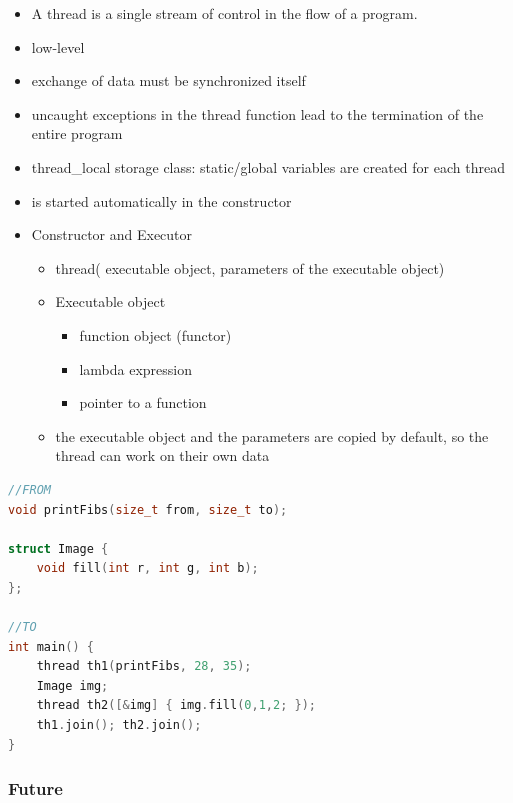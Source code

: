 \begin{itemize}
\tightlist
\item
  A thread is a single stream of control in the flow of a program.
\item
  low-level
\item
  exchange of data must be synchronized itself
\item
  uncaught exceptions in the thread function lead to the termination of
  the entire program
\item
  thread\_local storage class: static/global variables are created for
  each thread
\item
  is started automatically in the constructor
\item
  Constructor and Executor

  \begin{itemize}
  \tightlist
  \item
    thread( executable object, parameters of the executable object)
  \item
    Executable object

    \begin{itemize}
    \tightlist
    \item
      function object (functor)
    \item
      lambda expression
    \item
      pointer to a function
    \end{itemize}
  \item
    the executable object and the parameters are copied by default, so
    the thread can work on their own data
  \end{itemize}
\end{itemize}

\begin{lstlisting}[language=C++]
//FROM
void printFibs(size_t from, size_t to);

struct Image {
    void fill(int r, int g, int b);
};

//TO
int main() {
    thread th1(printFibs, 28, 35);
    Image img;
    thread th2([&img] { img.fill(0,1,2; });
    th1.join(); th2.join();
}
\end{lstlisting}

\hypertarget{future}{%
\subsubsection{Future}\label{future}}

